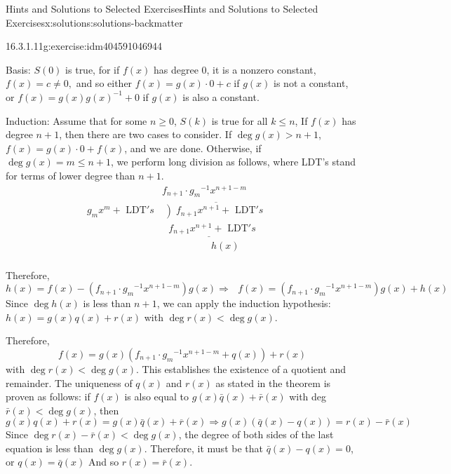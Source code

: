 \documentclass[twoside,10pt,]{book}
\numberwithin{equation}{section}
\begin{document}
\begin{solutions-chapter}{Hints and Solutions to Selected Exercises}{}{Hints and Solutions to Selected Exercises}{}{}{x:solutions:solutions-backmatter}
\begin{divisionsolution}{16.3.1.11}{}{g:exercise:idm404591046944}
\par
Basis: \(S(0)\) is true, for if \(f(x)\)  has degree 0, it is a nonzero constant, \(f(x)=c\neq 0,\) and so either \(f(x) =g(x)\cdot 0 + c\)  if \(g(x)\) is not a constant, or \(f(x) = g(x)g(x)^{-1}+0\) if \(g(x)\) is also a constant.%
\par
Induction: Assume that for some \(n\geq 0\), \(S(k)\) is true for all \(k \leq  n\), If \(f(x)\) has degree \(n+1\), then there are two cases to consider. If \(\deg  g(x) > n + 1\), \(f(x) = g(x)\cdot 0 + f(x)\), and we are done. Otherwise, if \(\deg  g(x) =m \leq  n + 1\), we perform long division as follows, where LDT's stand for terms of lower degree than \(n+1\).%
\begin{equation*}
\begin{array}{rll}
& f_{n+1}\cdot g_m{}^{-1}x^{n+1-m} \\
g_mx^m+ \textrm{ LDT}'s & \overline{\left) f_{n+1}x^{n+1}\right.+ \textrm{ LDT}'s 
\textrm{                     }}& \\ & \underline{\textrm{    }f_{n+1}x^{n+1}+ \textrm{ LDT}'s}\textrm{ 
}\\& \quad\quad\quad\quad\quad h(x) \\
\end{array}
\end{equation*}
%
\par
Therefore,%
\begin{equation*}
h(x) = f(x)-\left(f_{n+1}\cdot g_m{}^{-1}x^{n+1-m}\right) g(x) \Rightarrow \textrm{   }f(x) = \left(f_{n+1}\cdot g_m{}^{-1}x^{n+1-m}\right)
g(x)+h(x) 
\end{equation*}
Since \(\deg  h(x)\) is less than \(n+1\), we can apply the induction hypothesis: \(h(x) = g(x)q(x) + r(x)\) with  \(\deg  r(x) < \deg  g(x)\).%
\par
Therefore,%
\begin{equation*}
f(x) = g(x)\left(f_{n+1}\cdot g_m{}^{-1}x^{n+1-m}+ q(x)\right) + r(x)
\end{equation*}
with  \(\deg  r(x) < \deg  g(x)\).  This establishes the existence of a quotient and remainder. The uniqueness of \(q(x)\) and \(r(x)\) as stated in the theorem is proven as follows: if \(f(x)\) is also equal to \(g(x)\bar{q}(x) + \bar{r}(x)\) with deg \(\bar{r}(x) < \deg  g(x)\), then%
\begin{equation*}
g(x)q(x) + r(x) = g(x) \bar{q}(x) +\overline{ r}(x) \Rightarrow  g(x) \left(\bar{q}(x)-q(x)\right)= r(x)-\bar{r}(x)
\end{equation*}
Since \(\deg  r(x) - \bar{r}(x) < \deg  g(x)\), the degree of both sides of the last equation is less than \(\deg  g(x)\). Therefore, it must be that \(\bar{q}(x) - q(x) = 0\), or \(q(x) =\bar{q}(x)\) And so \(r(x) = \bar{r}(x)\).%

\end{divisionsolution}
\end{solutions-chapter}
\end{document}
